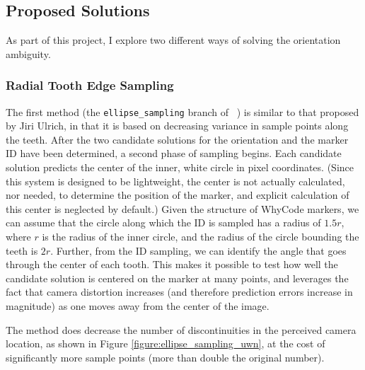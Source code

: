 \subsection{Proposed Solutions}

As part of this project, I explore two different ways of solving the orientation ambiguity.

\subsubsection{Radial Tooth Edge Sampling}

The first method (the \texttt{ellipse\_sampling} branch of ~\cite{uzgit_whycon}) is similar to that proposed by Jiri Ulrich,
in that it is based on decreasing variance in sample points along the teeth.
After the two candidate solutions for the orientation and the marker ID have been determined,
a second phase of sampling begins.
Each candidate solution predicts the center of the inner, white circle in pixel coordinates.
(Since this system is designed to be lightweight, the center is not actually calculated, nor needed, to determine the position of the marker,
and explicit calculation of this center is neglected by default.)
Given the structure of WhyCode markers, we can assume that the circle along which the ID is sampled
has a radius of $1.5r$, where $r$ is the radius of the inner circle, and the radius of the circle bounding the teeth is $2r$.
Further, from the ID sampling, we can identify the angle that goes through the center of each tooth.
This makes it possible to test how well the candidate solution is centered on the marker at many points,
and leverages the fact that camera distortion increases (and therefore prediction errors increase in magnitude) as one moves away from the center of the image.

The method does decrease the number of discontinuities in the perceived camera location, as shown in Figure \ref{figure:ellipse_sampling_uwn},
at the cost of significantly more sample points (more than double the original number).

